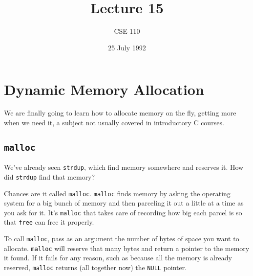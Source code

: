 

\def\brac#1{$<$#1$>$}
\def\Int{{\tt int}}
\def\int{\brac{\Int}}
\def\int{\brac{\Int}}
\def\Shortint{{\tt short~int}}
\def\shortint{\brac{\Shortint}}
\def\Longint{{\tt long~int}}
\def\longint{\brac{\Longint}}
\def\Float{{\tt float}}
\def\float{\brac{\Float}}
\def\Double{{\tt double}}
\def\double{\brac{\Double}}
\def\Char{{\tt char}}
\def\chr{\brac{\Char}}
\def\Void{{\tt void}}
\def\void{\brac{\Void}}

\def\ptr#1{pointer~to #1}
\def\p2#1{\brac{\ptr#1}}
\def\Ano#1#2{array~of {#1}~#2s}
\def\ano#1#2{\brac{\Ano#1#2}}
\def\Ao#1{array~of #1}
\def\ao#1{\brac{\Ao#1}}

\def\np{{\tt NULL} pointer}

\def\breakhere{\mbox{$\otimes$}}


\title{Lecture 15}
\author{CSE 110}
\date{25 July 1992}

\parskip 8pt


\maketitle

\section{Dynamic Memory Allocation}

We are finally going to learn how to allocate memory on the fly, getting
more when we need it, a subject not usually covered in introductory C
courses.

\subsection{{\tt malloc}}

We've already seen {\tt strdup}, which find memory somewhere and reserves
it.  How did {\tt strdup} find that memory?

Chances are it called {\tt malloc}.  {\tt malloc} finds memory by asking
the operating system for a big bunch of memory and then parceling it
out a little at a time as you ask for it.  It's {\tt malloc} that takes
care of recording how big each parcel is so that {\tt free} can free it
properly.  

To call {\tt malloc}, pass as an argument the number of bytes of space
you want to allocate.  {\tt malloc} will reserve that many bytes and
return a pointer to the memory it found.  If it fails for any reason,
such as because all the memory is already reserved, {\tt malloc} returns
(all together now) the {\tt NULL} pointer.  

